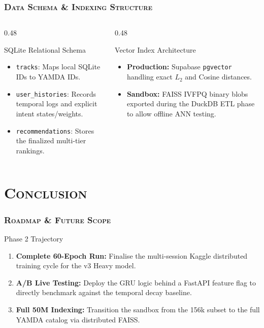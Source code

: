 \documentclass[aspectratio=169,10pt]{beamer}
\begin{document}
\begin{frame}
  \frametitle{\textsc{Data Schema \& Indexing Structure}}

  \begin{columns}[T]
    \begin{column}{0.48\textwidth}
      \begin{exampleblock}{SQLite Relational Schema}
        \fontsize{7.5pt}{9.5pt}\selectfont
        \begin{itemize}
          \item \texttt{tracks}: Maps local SQLite IDs to YAMDA IDs.
          \item \texttt{user\_histories}: Records temporal logs and explicit intent states/weights.
          \item \texttt{recommendations}: Stores the finalized multi-tier rankings.
        \end{itemize}
      \end{exampleblock}
    \end{column}
    \begin{column}{0.48\textwidth}
      \begin{block}{Vector Index Architecture}
        \fontsize{7.5pt}{9.5pt}\selectfont
        \begin{itemize}
          \item \textbf{Production:} Supabase \texttt{pgvector} handling exact $L_2$ and Cosine distances.
          \item \textbf{Sandbox:} FAISS IVFPQ binary blobs exported during the DuckDB ETL phase to allow offline ANN testing.
        \end{itemize}
      \end{block}
    \end{column}
  \end{columns}
\end{frame}

\section{\textsc{Conclusion}}
\begin{frame}
  \frametitle{\textsc{Roadmap \& Future Scope}}

  \begin{block}{Phase 2 Trajectory}
    \begin{enumerate}
      \item \textbf{Complete 60-Epoch Run:} Finalise the multi-session Kaggle distributed training cycle for the v3 Heavy model.
      \item \textbf{A/B Live Testing:} Deploy the GRU logic behind a FastAPI feature flag to directly benchmark against the temporal decay baseline.
      \item \textbf{Full 50M Indexing:} Transition the sandbox from the 156k subset to the full YAMDA catalog via distributed FAISS.
    \end{enumerate}
  \end{block}
\end{frame}
\end{document}
